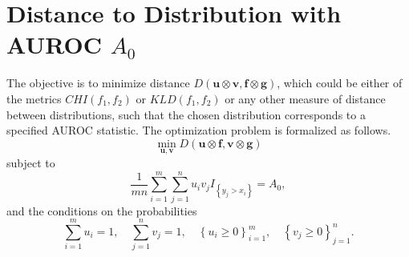 

\section{Distance to Distribution with AUROC $A_0$} \label{app:soln}

The objective is to minimize distance 
$D(\mathbf{u} \otimes \mathbf{v},\mathbf{f} \otimes \mathbf{g})$, which could be either of the metrics $CHI(f_1, f_2)$ or $KLD(f_1, f_2)$ or any other measure of distance between distributions, such that the chosen distribution corresponds to a specified AUROC statistic.
% 
The optimization problem is formalized as follows. 
% 
\begin{equation}
    \min_{\mathbf{u},\mathbf{v}}
        D(\mathbf{u} \otimes \mathbf{f}, \mathbf{v} \otimes \mathbf{g})
\end{equation}
\noindent subject to
\begin{equation}
    \frac{1}{m n} \sum_{i = 1}^{m} \sum_{j = 1}^{n} u_i v_j I_{\left\{ y_j > x_i \right\}} = A_0,
\end{equation}
\noindent and the conditions on the probabilities
\begin{equation}
    \sum_{i = 1}^{m} u_i = 1, \quad \sum_{j = 1}^{n} v_j = 1, \quad \left\{ u_i \geq 0 \right\}_{i=1}^{m}, \quad \left\{ v_j \geq 0 \right\}_{j=1}^{n}.
\end{equation}

